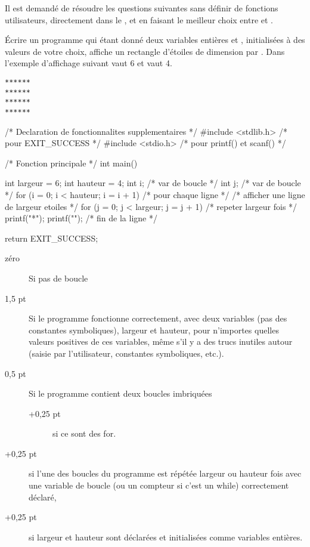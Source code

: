 Il est demandé de résoudre les questions suivantes sans définir de
fonctions utilisateurs, directement dans le , et en faisant le meilleur choix entre 
et .

\question Écrire un programme qui étant donné deux variables entières
 et , initialisées à des valeurs de votre choix,
affiche un rectangle d'étoiles de dimension  par
. Dans l'exemple d'affichage suivant  vaut 6 et 
vaut 4.
\begin{verbatim}
******
******
******
******
\end{verbatim}

\begin{correction}
  \begin{listing}{1}
/* Declaration de fonctionnalites supplementaires */
#include <stdlib.h> /* pour EXIT_SUCCESS */
#include <stdio.h> /* pour printf() et scanf() */

/* Fonction principale */
int main()
{
    int largeur = 6;
    int hauteur = 4;
    int i; /* var de boucle */
    int j; /* var de boucle */
    for (i = 0; i < hauteur; i = i + 1) /* pour chaque ligne */
    {
	/* afficher une ligne de largeur etoiles */
	for (j = 0; j < largeur; j = j + 1) /* repeter largeur fois */
	{
	    printf("*");
	}
	printf("\n"); /* fin de la ligne */
    }	

    return EXIT_SUCCESS;
}
  \end{listing}
  \begin{baremeenv}
   \begin{description}
      \item[zéro] Si pas de boucle
\item[1,5 pt] Si le programme fonctionne correctement, avec deux
  variables (pas des constantes symboliques), largeur et hauteur, pour
  n'importes quelles valeurs positives de ces variables, même s'il y a
  des trucs inutiles autour (saisie par l'utilisateur, constantes
  symboliques, etc.).
\item[0,5 pt] Si le programme contient deux boucles imbriquées 
  \begin{description}
  \item[+0,25 pt] si ce sont des for.
  \end{description}
\item[+0,25 pt] si l'une des boucles du programme est répétée largeur ou hauteur
  fois avec une variable de boucle (ou un compteur si c'est un while)
  correctement déclaré,
\item[+0,25 pt] si largeur et hauteur sont déclarées et initialisées
  comme variables entières.
  \end{description}
  \end{baremeenv}
\end{correction}

